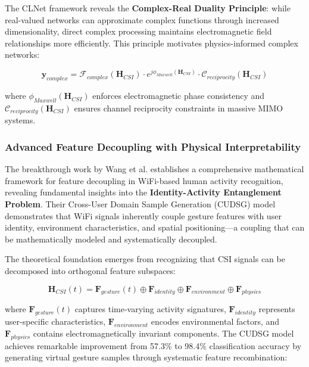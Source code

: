 \documentclass[journal]{IEEEtran}
\begin{document}
The CLNet framework reveals the \textbf{Complex-Real Duality Principle}: while real-valued networks can approximate complex functions through increased dimensionality, direct complex processing maintains electromagnetic field relationships more efficiently. This principle motivates physics-informed complex networks:

\begin{equation}
\mathbf{y}_{complex} = \mathcal{F}_{complex}(\mathbf{H}_{CSI}) \cdot e^{j\phi_{Maxwell}(\mathbf{H}_{CSI})} \cdot \mathcal{C}_{reciprocity}(\mathbf{H}_{CSI})
\label{eq:mimo_physics_complex}
\end{equation}

where $\phi_{Maxwell}(\mathbf{H}_{CSI})$ enforces electromagnetic phase consistency and $\mathcal{C}_{reciprocity}(\mathbf{H}_{CSI})$ ensures channel reciprocity constraints in massive MIMO systems.

\subsubsection{Advanced Feature Decoupling with Physical Interpretability}

The breakthrough work by Wang et al. \cite{wang2024feature} establishes a comprehensive mathematical framework for feature decoupling in WiFi-based human activity recognition, revealing fundamental insights into the \textbf{Identity-Activity Entanglement Problem}. Their Cross-User Domain Sample Generation (CUDSG) model demonstrates that WiFi signals inherently couple gesture features with user identity, environment characteristics, and spatial positioning—a coupling that can be mathematically modeled and systematically decoupled.

The theoretical foundation emerges from recognizing that CSI signals can be decomposed into orthogonal feature subspaces:

\begin{equation}
\mathbf{H}_{CSI}(t) = \mathbf{F}_{gesture}(t) \oplus \mathbf{F}_{identity} \oplus \mathbf{F}_{environment} \oplus \mathbf{F}_{physics}
\label{eq:feature_decomposition}
\end{equation}

where $\mathbf{F}_{gesture}(t)$ captures time-varying activity signatures, $\mathbf{F}_{identity}$ represents user-specific characteristics, $\mathbf{F}_{environment}$ encodes environmental factors, and $\mathbf{F}_{physics}$ contains electromagnetically invariant components. The CUDSG model achieves remarkable improvement from 57.3\% to 98.4\% classification accuracy by generating virtual gesture samples through systematic feature recombination:
\end{document}

